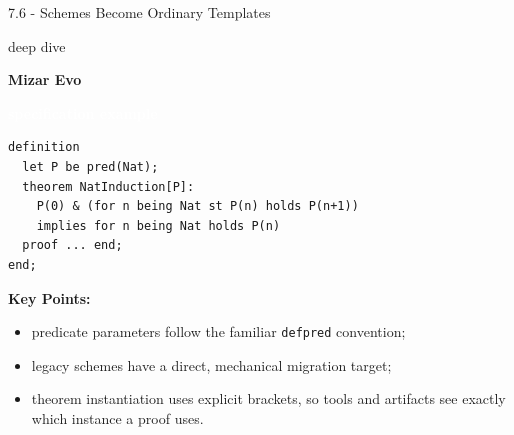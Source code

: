 \documentclass[aspectratio=169,11pt]{beamer}
\newcommand{\statusbadge}[2]{\colorbox{#1}{\textcolor{white}{\strut\scriptsize\sffamily\bfseries #2}}}
\newcommand{\badgeSpec}{\statusbadge{green!35!black}{specification example}}
\newcommand{\deepdivetag}{\hfill\colorbox{black!15}{\textcolor{black!65}{\strut\scriptsize\sffamily deep dive}}}
\begin{document}
\begin{frame}[fragile,t]{7.6 - Schemes Become Ordinary Templates\deepdivetag}
\smallskip
\textbf{Mizar Evo}~\badgeSpec
\begin{lstlisting}[language={mizar},basicstyle=\ttfamily\small]
definition
  let P be pred(Nat);
  theorem NatInduction[P]:
    P(0) & (for n being Nat st P(n) holds P(n+1))
    implies for n being Nat holds P(n)
  proof ... end;
end;
\end{lstlisting}
\smallskip
\textbf{Key Points:}
\begin{itemize}
\setlength{\itemsep}{1pt}
\setlength{\parsep}{0pt}
\setlength{\parskip}{0pt}
\item predicate parameters follow the familiar \texttt{defpred} convention;
\item legacy schemes have a direct, mechanical migration target;
\item theorem instantiation uses explicit brackets, so tools and artifacts see exactly which instance a proof uses.
\end{itemize}
\end{frame}
\end{document}
